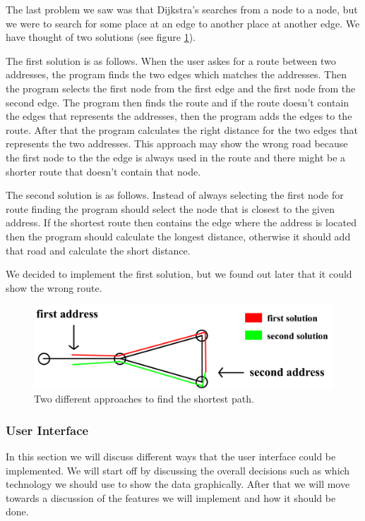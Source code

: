 \documentclass[a4paper,10pt,titlepage]{article}
\begin{document}
The last problem we saw was that Dijkstra’s searches from a node to a node, but we were to search for some place at an edge to another place at another edge. We have thought of two solutions (see figure \ref{fig:routeFinding}). 

The first solution is as follows. When the user askes for a route between two addresses, the program finds the two edges which matches the addresses. Then the program selects the first node from the first edge and the first node from the second edge. The program then finds the route and if the route doesn't contain the edges that represents the addresses, then the program adds the edges to the route. After that the program calculates the right distance for the two edges that represents the two addresses.  This approach may show the wrong road because the first node to the the edge is always used in the route and there might be a shorter route that doesn't contain that node. 

The second solution is as follows. Instead of always selecting the first node for route finding the program should select the node that is closest to the given address. If the shortest route then contains the edge where the address is located then the program should calculate the longest distance, otherwise it should add that road and calculate the short distance.

We decided to implement the first solution, but we found out later that it could show the wrong route. \\

\begin{figure}[H]
\includegraphics[width=120mm]{routeFinding.png}
\caption{Two different approaches to find the shortest path.}
\label{fig:routeFinding}
\end{figure}

			\subsubsection{User Interface}

				In this section we will discuss different ways that the user interface could be implemented. We will start off by discussing the overall decisions such as which technology we should use to show the data graphically. After that we will move towards a discussion of the features we will implement and how it should be done.  
\end{document}
